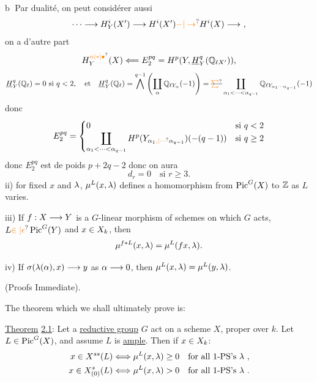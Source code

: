 \textcircled{b} Par dualité, on peut considérer aussi
\[
\cdots\longrightarrow H_Y^i(X')\longrightarrow H^i(X')\unsure{-|\to}H^i(X)\longrightarrow\ ,
\]
on a d'autre part
\[
H_Y^{\unsure{n|*|\bullet}}(X)\Longleftarrow E_2^{pq}=H^p(Y,\underline H_Y^q(\mathbb{Q}_{\ell X'})),
\]
\[
\underline H_Y^q(\mathbb{Q}_\ell)=0\ \text{si }q<2,\quad\text{et}\quad
\underline H_Y^q(\mathbb{Q}_\ell)=\mathop{\bigwedge}^{q-1}\left(\coprod_\alpha\mathbb{Q}_{\ell Y_\alpha}(-1)\right)=\deleted{\unsure{\sum}}\coprod_{\alpha_1<\cdots<\alpha_{q-1}}\mathbb{Q}_{\ell Y_{\alpha_1\cdots\alpha_{q-1}}}(-1)
\]
donc
\[
E_2^{pq}=\begin{cases}
0&\text{si }q<2\\
\displaystyle\coprod_{\alpha_1<\cdots<\alpha_{q-1}}H^p(Y_{\alpha_1\unsure{,|\cdots}\alpha_{q-1}})(-(q-1))&\text{si }q\geq2
\end{cases}
\]
donc $E_2^{pq}$ est de poids $p+2q-2$ donc on  aura 
\[
d_r=0\quad\text{si }r\geq3.
\]
ii) for fixed $x$ and $\lambda$, $\mu^{L}(x,\lambda)$ defines a homomorphism from $\operatorname{Pic}^{G}(X)$ to $\mathbb{Z}$ as $L$ varies.

iii) If $f:X\longrightarrow Y$ is a $G$-linear morphism of schemes on which $G$ acts, $L\handwritten{\unsure{\in|\epsilon}}\operatorname{Pic}^{\handwritten{G}}(Y)$ and $x\in X_{k}$, then
\[
\mu^{f*L}(x,\lambda)=\mu^{L}(fx,\lambda).
\]

iv) If $\sigma(\lambda(\alpha),x)\longrightarrow y$ as $\alpha\longrightarrow0$, then $\mu^{L}(x,\lambda)=\mu^{L}(y,\lambda)$.

(Proofs Immediate).

The theorem which we shall ultimately prove is:

\uline{Theorem} \uline{2.1}: Let a \uline{reductive group} $G$ act on a scheme $X$, proper over $k$. Let $L\in\operatorname{Pic}^{G}(X)$, and assume $L$ is \uline{ample}. Then if $x\in X_{k}$:
\[
\begin{aligned}
x\in X^{ss}(L)&\Longleftrightarrow\mu^{L}(x,\lambda)\geq0\quad\text{for all 1-PS's }\lambda\ ,\\
x\in X^{s}_{(0)}(L)&\Longleftrightarrow\mu^{L}(x,\lambda)>0\quad\text{for all 1-PS's }\lambda\ .
\end{aligned}
\]

